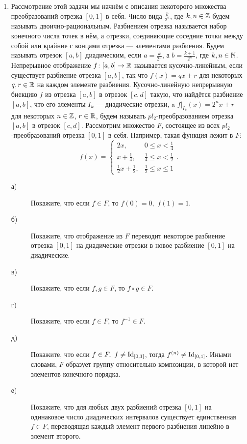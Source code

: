\begin{enumerate}
\item Рассмотрение этой задачи мы начнём с описания некоторого множества преобразований отрезка $[0,1]$ в себя. Число вида $\frac{k}{2^n}$, где $k,n\in\mathbb{Z}$ будем называть двоично-рациональным. Разбиением отрезка называется набор конечного числа точек в нём, а отрезки, соединяющие соседние точки между собой или крайние с концами отрезка --- элементами разбиения. Будем называть отрезок $[a,b]$ диадическим, если $a=\frac{k}{2^n}$, а $b=\frac{k+1}{2^{n}}$, где $k, n\in\mathbb{N}$. Непрерывное отображение $f\colon [a,b]\to \mathbb{R}$  называется кусочно-линейным, если существует разбиение отрезка $[a,b]$, так что $f(x)=qx+r$ для некоторых $q,r\in\mathbb{R}$ на каждом элементе разбиения. Кусочно-линейную непрерывную биекцию $f$ из отрезка $[a,b]$ в отрезок $[c,d]$ такую, что найдётся разбиение $[a,b]$, что его элементы $I_k$ --- диадические отрезки, a $f|_{I_k}(x)=2^nx+r$ для некоторых $n\in\mathbb{Z}$, $r\in \mathbb{R}$, будем называть $pl_2$-преобразованием отрезка $[a,b]$ в отрезок $[c,d]$. Рассмотрим множество $F$, состоящее из всех $pl_2$-преобразований отрезка $[0,1]$ в себя. Например, такая функция лежит в $F$:
$$ f(x)=\begin{cases}
2x,& 0\leq x<\frac{1}{4}\\
x+\frac{1}{4},& \frac{1}{4}\leq x<\frac{1}{2}\\
\frac{1}{2}x +\frac{1}{2},& \frac{1}{2}\leq x \leq 1
\end{cases}.
$$
\begin{description}
\item[а)] Покажите, что если $f\in F$, то $f(0)=0,\,\, f(1)=1$.
\item[б)] Покажите, что отображение из $F$ переводит некоторое разбиение отрезка $[0,1]$ на диадические отрезки в новое разбиение $[0,1]$ на диадические.
\item[в)] Покажите, что если $f,g\in F$, то $f\circ g\in F$.
\item[г)] Покажите, что если $f\in F$, то $f^{-1}\in F$.
\item[д)] Покажите, что если $f\in F, \,\, f\neq \operatorname{Id}_{[0,1]}$, тогда $f^{(n)}\neq \operatorname{Id}_{[0,1]}$. Иными словами, $F$ образует группу относительно композиции, в которой нет элементов конечного порядка.
\item[е)] Покажите, что для любых двух разбиений отрезка $[0,1]$ на одинаковое число диадических интервалов существует единственная $f\in F$, переводящая каждый элемент первого разбиения линейно в элемент второго.

\end{description}
\end{enumerate}
